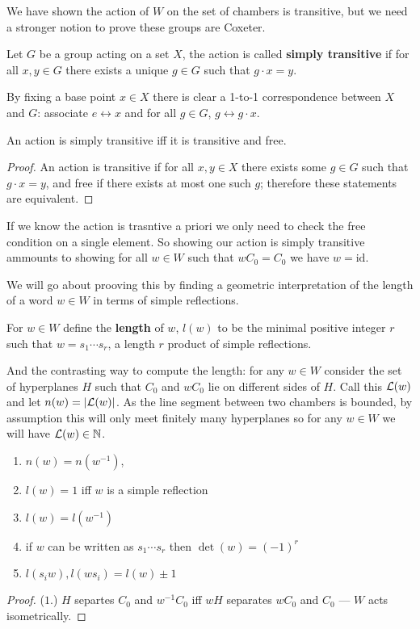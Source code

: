 \documentclass[../main.tex]{subfiles}
\begin{document}
We have shown the action of $W$ on the set of chambers is transitive, but we need a stronger notion to prove these groups are Coxeter.

\begin{definition}
    Let $G$ be a group acting on a set $X$, the action is called \textbf{simply transitive} if for all $x,y\in G$ there exists a unique $g\in G$ such that $g\cdot x = y$.
\end{definition}

By fixing a base point $x\in X$ there is clear a 1-to-1 correspondence between $X$ and $G$: associate $e\leftrightarrow x$ and for all $g\in G$, $g\leftrightarrow g\cdot x$.

\begin{proposition}
    An action is simply transitive iff it is transitive and free.
    \begin{proof}
        An action is transitive if for all $x,y\in X$ there exists some $g\in G$ such that $g\cdot x = y$, and free if there exists at most one such $g$; therefore these statements are equivalent.
    \end{proof}
\end{proposition}

If we know the action is trasntive a priori we only need to check the free condition on a single element. So showing our action is simply transitive ammounts to showing for all $w\in W$ such that $wC_0 = C_0$ we have $w=\text{id}$.

We will go about prooving this by finding a geometric interpretation of the length of a word $w\in W$ in terms of simple reflections.

\begin{definition}
    For $w\in W$ define the \textbf{length} of $w$, $l(w)$ to be the minimal positive integer $r$ such that $w=s_1\cdots s_r$, a length $r$ product of simple reflections.
\end{definition}

And the contrasting way to compute the length: for any $w\in W$ consider the set of hyperplanes $H$ such that $C_0$ and $wC_0$ lie on different sides of $H$. Call this $\mathcal{L}(w)$ and let $n(w) = |\mathcal{L}(w)|$. As the line segment between two chambers is bounded, by assumption this will only meet finitely many hyperplanes so for any $w\in W$ we will have $\mathcal{L}(w)\in \mathbb{N}$.

\begin{lemma}
    \begin{enumerate}
        \item $n(w) = n(w^{-1})$,
        \item $l(w) = 1$ iff $w$ is a simple reflection
        \item $l(w) = l(w^{-1})$
        \item if $w$ can be written as $s_1\cdots s_r$ then $\det(w) = (-1)^r$
        \item $l(s_i w),l(w s_i) = l(w) \pm 1$
    \end{enumerate}
    \begin{proof}
        ($1.$) $H$ separtes $C_0$ and $w^{-1}C_0$ iff $wH$ separates $wC_0$ and $C_0$ --- $W$ acts isometrically.
    \end{proof}
\end{lemma}
\end{document}
